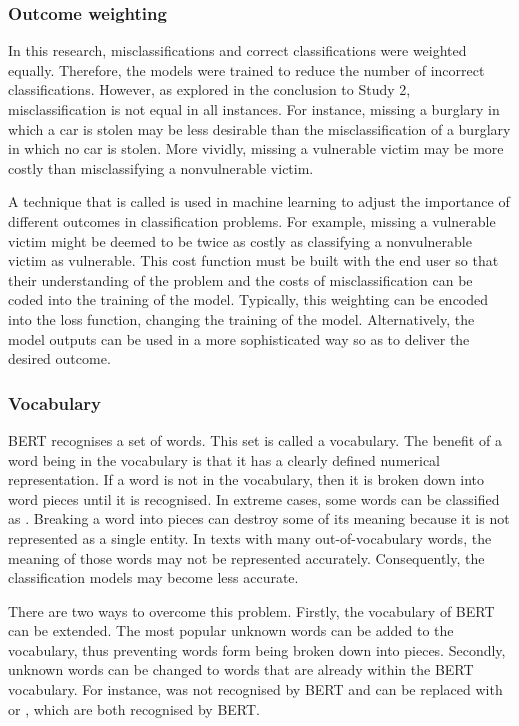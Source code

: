 \subsubsection{Outcome weighting} In this research, misclassifications and correct classifications were weighted equally. Therefore, the models were trained to reduce the number of incorrect classifications. However, as explored in the conclusion to Study 2, misclassification is not equal in all instances. For instance, missing a burglary in which a car is stolen may be less desirable than the misclassification of a burglary in which no car is stolen. More vividly, missing a vulnerable victim may be more costly than misclassifying a nonvulnerable victim.

A technique that is called  is used in machine learning to adjust the importance of different outcomes in classification problems. For example, missing a vulnerable victim might be deemed to be twice as costly as classifying a nonvulnerable victim as vulnerable. This cost function must be built with the end user so that their understanding of the problem and the costs of misclassification can be coded into the training of the model. Typically, this weighting can be encoded into the loss function, changing the training of the model. Alternatively, the model outputs can be used in a more sophisticated way so as to deliver the desired outcome.



\subsubsection{Vocabulary} BERT recognises a set of words. This set is called a vocabulary. The benefit of a word being in the vocabulary is that it has a clearly defined numerical representation. If a word is not in the vocabulary, then it is broken down into word pieces until it is recognised. In extreme cases, some words can be classified as . Breaking a word into pieces can destroy some of its meaning because it is not represented as a single entity. In texts with many out-of-vocabulary words, the meaning of those words may not be represented accurately. Consequently, the classification models may become less accurate.

There are two ways to overcome this problem. Firstly, the vocabulary of BERT can be extended. The most popular unknown words can be added to the vocabulary, thus preventing words form being broken down into pieces. Secondly, unknown words can be changed to words that are already within the BERT vocabulary. For instance,  was not recognised by BERT and can be replaced with  or , which are both recognised by BERT.

